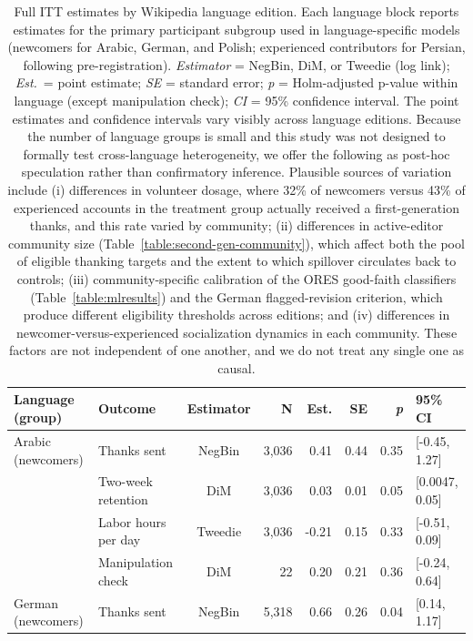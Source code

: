 \documentclass[9pt,twoside,lineno]{pnas-new}
\begin{document}
\clearpage
\begin{table}[ht]
\centering
\small
\caption{Full ITT estimates by Wikipedia language edition. Each language block reports estimates for the primary participant subgroup used in language-specific models (newcomers for Arabic, German, and Polish; experienced contributors for Persian, following pre-registration). \textit{Estimator} = NegBin, DiM, or Tweedie (log link); \textit{Est.}\ = point estimate; \textit{SE} = standard error; \textit{p} = Holm-adjusted p-value within language (except manipulation check); \textit{CI} = 95\% confidence interval. The point estimates and confidence intervals vary visibly across language editions. Because the number of language groups is small and this study was not designed to formally test cross-language heterogeneity, we offer the following as post-hoc speculation rather than confirmatory inference. Plausible sources of variation include (i) differences in volunteer dosage, where 32\% of newcomers versus 43\% of experienced accounts in the treatment group actually received a first-generation thanks, and this rate varied by community; (ii) differences in active-editor community size (Table~\ref{table:second-gen-community}), which affect both the pool of eligible thanking targets and the extent to which spillover circulates back to controls; (iii) community-specific calibration of the ORES good-faith classifiers (Table~\ref{table:mlresults}) and the German flagged-revision criterion, which produce different eligibility thresholds across editions; and (iv) differences in newcomer-versus-experienced socialization dynamics in each community. These factors are not independent of one another, and we do not treat any single one as causal.}
\label{table:full_itt_language}
\begin{tabular}{llcrrrrl}
\toprule
\textbf{Language (group)} & \textbf{Outcome} & \textbf{Estimator} & \textbf{N} & \textbf{Est.} & \textbf{SE} & \textbf{\textit{p}} & \textbf{95\% CI} \\
\midrule
Arabic (newcomers) & Thanks sent & NegBin & 3,036 & 0.41 & 0.44 & 0.35 & [-0.45, 1.27] \\
 & Two-week retention & DiM & 3,036 & 0.03 & 0.01 & 0.05 & [0.0047, 0.05] \\
 & Labor hours per day & Tweedie & 3,036 & -0.21 & 0.15 & 0.33 & [-0.51, 0.09] \\
 & Manipulation check & DiM & 22 & 0.20 & 0.21 & 0.36 & [-0.24, 0.64] \\
\addlinespace
German (newcomers) & Thanks sent & NegBin & 5,318 & 0.66 & 0.26 & 0.04 & [0.14, 1.17] \\

\end{tabular}
\end{table}
\end{document}
